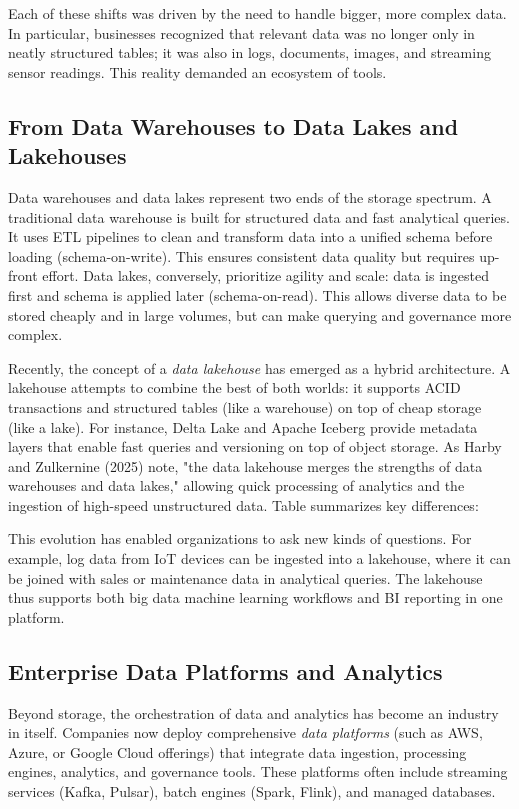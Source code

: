 Each of these shifts was driven by the need to handle bigger, more complex data. In particular, businesses recognized that relevant data was no longer only in neatly structured tables; it was also in logs, documents, images, and streaming sensor readings. This reality demanded an ecosystem of tools.

\subsection{From Data Warehouses to Data Lakes and Lakehouses}
Data warehouses and data lakes represent two ends of the storage spectrum. A traditional data warehouse is built for structured data and fast analytical queries. It uses ETL pipelines to clean and transform data into a unified schema before loading (schema-on-write). This ensures consistent data quality but requires up-front effort. Data lakes, conversely, prioritize agility and scale: data is ingested first and schema is applied later (schema-on-read). This allows diverse data to be stored cheaply and in large volumes, but can make querying and governance more complex.

Recently, the concept of a \emph{data lakehouse} has emerged as a hybrid architecture. A lakehouse attempts to combine the best of both worlds: it supports ACID transactions and structured tables (like a warehouse) on top of cheap storage (like a lake). For instance, Delta Lake and Apache Iceberg provide metadata layers that enable fast queries and versioning on top of object storage. As Harby and Zulkernine (2025) note, "the data lakehouse merges the strengths of data warehouses and data lakes," allowing quick processing of analytics and the ingestion of high-speed unstructured data. Table summarizes key differences:

This evolution has enabled organizations to ask new kinds of questions. For example, log data from IoT devices can be ingested into a lakehouse, where it can be joined with sales or maintenance data in analytical queries. The lakehouse thus supports both big data machine learning workflows and BI reporting in one platform.

\subsection{Enterprise Data Platforms and Analytics}
Beyond storage, the orchestration of data and analytics has become an industry in itself. Companies now deploy comprehensive \emph{data platforms} (such as AWS, Azure, or Google Cloud offerings) that integrate data ingestion, processing engines, analytics, and governance tools. These platforms often include streaming services (Kafka, Pulsar), batch engines (Spark, Flink), and managed databases. 

